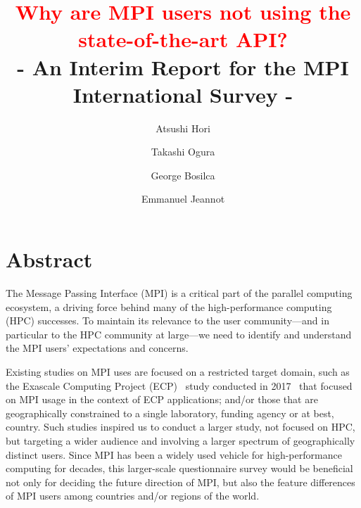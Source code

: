 \documentclass[sigconf,nonacm]{acmart}
\begin{document}
\title{\textcolor{red}{Why are MPI users not using the state-of-the-art API?}\\
- An Interim Report for the MPI International Survey -}


\author{Atsushi Hori}
\author{Takashi Ogura}

\author{George Bosilca}

\author{Emmanuel Jeannot}

\maketitle

\section{Abstract}

The Message Passing Interface (MPI) is a critical part of the parallel computing
ecosystem, a driving force behind many of the high-performance computing (HPC) successes.
To maintain its relevance to the user community---and in particular to the HPC
community at large---we need to identify and understand the MPI users' expectations and concerns.

%
Existing studies on MPI uses are focused on a restricted target domain,
such as the Exascale Computing Project (ECP)~\cite{ECP} study conducted in 2017~\cite{osti_1462877} that focused
on MPI usage in the context of ECP applications; and/or those that are geographically
constrained to a single laboratory, funding agency or at best, country.
%
Such studies inspired us to conduct a larger study, not focused on HPC, but
targeting a wider audience and involving a larger spectrum of geographically
distinct users. Since MPI has been a widely used vehicle for high-performance
computing for decades, this larger-scale questionnaire survey would be
beneficial not only for deciding the future direction of MPI, but also the
feature differences of MPI users among countries and/or regions of the world.
\end{document}
